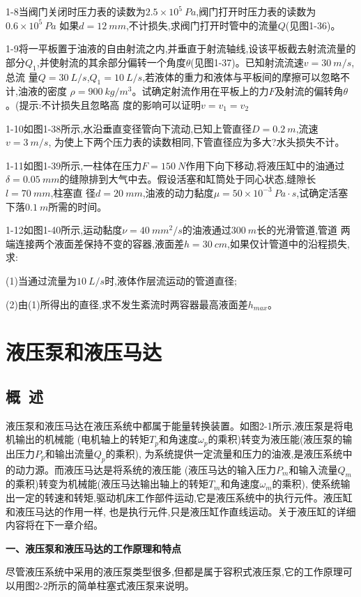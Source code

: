 1-8\quad 当阀门关闭时压力表的读数为$2.5\times 10^{5}\ Pa$,阀门打开时压力表的读数为$0.6\times 10^5\ Pa$
如果$d=12\ mm$,不计损失,求阀门打开时管中的流量$Q$(见图1-36)。

1-9\quad 将一平板置于油液的自由射流之内,并垂直于射流轴线,设该平板截去射流流量的
部分$Q_1$,并使射流的其余部分偏转一个角度$\theta $(见图1-37)。已知射流流速$v=30\ m/s$,总流
量$Q=30\ L/s$,$Q_1=10\ L/s$,若液体的重力和液体与平板间的摩擦可以忽略不计,油液的密度
$\rho=900\ kg/m^3$。试确定射流作用在平板上的力$F$及射流的偏转角$\theta $。(提示:不计损失且忽略高
度的影响可以证明$v=v_1=v_2$

1-10\quad 如图1-38所示,水沿垂直变径管向下流动,已知上管直径$D=0.2\ m$,流速$v=3\ m/s$,
为使上下两个压力表的读数相同,下管直径应为多大?水头损失不计。

1-11\quad 如图1-39所示,一柱体在压力$F=150\ N$作用下向下移动,将液压缸中的油通过
$\delta =0.05\ mm$的缝隙排到大气中去。假设活塞和缸筒处于同心状态,缝隙长$l=70\ mm$,柱塞直
径$d=20\ mm$,油液的动力黏度$\mu =50\times 10^{-3}\ Pa\cdot s$,试确定活塞下落$0.1\ m$所需的时间。


1-12\quad 如图1-40所示,运动黏度$\nu = 40\ mm^2/s$的油液通过$300\ m$长的光滑管道,管道
两端连接两个液面差保持不变的容器,液面差$h=30\ cm$,如果仅计管道中的沿程损失,求:

(1)当通过流量为$10\ L/s$时,液体作层流运动的管道直径;
    
(2)由(1)所得出的直径,求不发生紊流时两容器最高液面差$h_{max}$。

\chapter{液压泵和液压马达}
\section{概\ 述}
液压泵和液压马达在液压系统中都属于能量转换装置。如图2-1所示,液压泵是将电机输出的机械能
(电机轴上的转矩$T_p$和角速度$\omega_p$的乘积)转变为液压能(液压泵的输出压力$P_p$和输出流量$Q_p$的乘积),
为系统提供一定流量和压力的油液,是液压系统中的动力源。而液压马达是将系统的液压能
(液压马达的输入压力$P_m$和输入流量$Q_m$的乘积)转变为机械能(液压马达输出轴上的转矩$T_m$和角速度$\omega_m$的乘积),
使系统输出一定的转速和转矩,驱动机床工作部件运动,它是液压系统中的执行元件。液压缸和液压马达的作用一样,
也是执行元件,只是液压缸作直线运动。关于液压缸的详细内容将在下一章介绍。

\textbf{一、液压泵和液压马达的工作原理和特点}

尽管液压系统中采用的液压泵类型很多,但都是属于容积式液压泵,它的工作原理可以用图2-2所示的简单柱塞式液压泵来说明。

